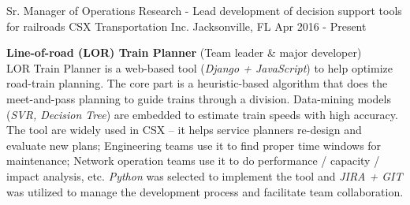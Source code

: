 

\begin{cventries}

\cventry
{Sr. Manager of Operations Research - Lead development of decision support tools for railroads}     %
{CSX Transportation Inc.}                %
{Jacksonville, FL}                       %
{Apr 2016 - Present}                     %
{
    \begin{cvitems}                          
        \item {
\textbf{Line-of-road (LOR) Train Planner} 
{(Team leader \& major developer) }  \\ 
LOR Train Planner is a web-based tool (\textit{Django + JavaScript}) to help optimize road-train planning. The core part is a heuristic-based algorithm that does the meet-and-pass planning to guide trains through a division. Data-mining models (\textit{SVR, Decision Tree}) are embedded to estimate train speeds with high accuracy. The tool are widely used in CSX -- it helps service planners re-design and evaluate new plans; Engineering teams use it to find proper time windows for maintenance; Network operation teams use it to do performance / capacity / impact analysis, etc. \textit{Python} was selected to implement the tool and \textit{JIRA + GIT} was utilized to manage the development process and facilitate team collaboration.            
        }
    \end{cvitems}%
}


\end{cventries}
